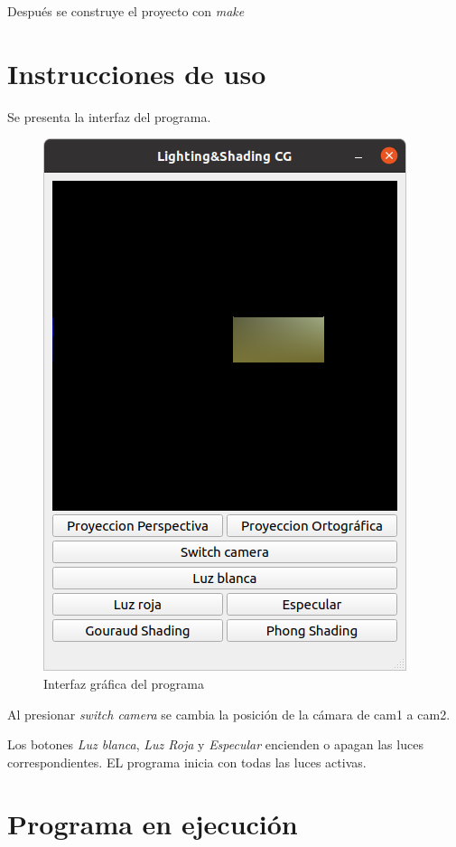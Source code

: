 \documentclass[12pt]{article}
\begin{document}
Después se construye el proyecto con \textit{make}



\section{Instrucciones de uso}
Se presenta la interfaz del programa.

\begin{figure}[H]
\centering
\includegraphics[scale=0.5]{images/gui.png}
\caption{Interfaz gráfica del programa}
\end{figure}

Al presionar \textit{switch camera} se cambia la posición de la cámara de cam1 a cam2.

Los botones \textit{Luz blanca}, \textit{Luz Roja} y \textit{Especular} encienden o apagan las luces correspondientes. EL programa inicia con todas las luces activas.



\section{Programa en ejecución}
\end{document}
